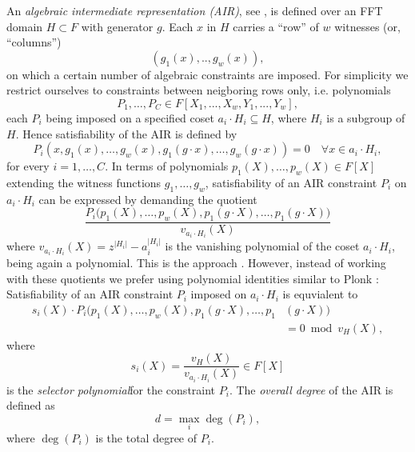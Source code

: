 \documentclass[11pt,article,oneside]{memoir}
\theoremstyle{definition}
\theoremstyle{remark}
\begin{document}
An \textit{algebraic intermediate representation (AIR)}, see \cite{Starks, DEEPFRI, ethSTARK}, is defined over an FFT domain $H\subset F$ with generator $g$. 
Each $x$ in $H$ carries a “row” of $w$ witnesses (or, “columns”)
\[
(g_1(x),.., g_w(x)),
\]
on which a certain number of algebraic constraints are imposed.
For simplicity we restrict ourselves to constraints between neigboring rows only, i.e. polynomials 
\[
P_1, \ldots ,P_{C}\in F[X_1,...,X_w,Y_1,...,Y_w],  
\] 
each $P_i$ being imposed on a specified coset $a_i\cdot H_i\subseteq H$, where $H_i$ is a subgroup of $H$.
Hence satisfiability of the AIR is defined by 
\begin{equation}
\label{e:AIRConstraint}
P_i(x, g_1(x),\ldots ,g_w(x),g_1(g\cdot x), \ldots,g_w(g\cdot x)) = 0 \quad \forall x \in a_i\cdot H_i,
\end{equation}
for every $i=1,\ldots,C$.
In terms of polynomials $p_1(X),\ldots, p_w(X)\in F[X]$ extending the witness functions $g_1, \ldots, g_w$, satisfiability of an AIR constraint $P_i$ on $a_i\cdot H_i$ can be expressed by demanding the quotient
\[
\frac{P_i\big(p_1(X), \ldots, p_w(X), p_1(g\cdot X), \ldots, p_1(g\cdot X)\big) }{ v_{a_i\cdot H_i}(X)}
\]
where $v_{a_i\cdot H_i}(X) = z^{|H_i|} - a_i^{|H_i|}$ is the vanishing polynomial of the coset $a_i\cdot H_i$, being again a polynomial.
This is the approach \cite{Starks, DEEPFRI, ethSTARK}.
However, instead of working with these quotients we prefer using polynomial identities similar to Plonk \cite{Plonk}:
Satisfiability of an AIR constraint $P_i$ imposed on $a_i\cdot H_i$ is equvialent to 
\begin{equation}
\label{e:AIRConstraintIdentity}
\begin{aligned}
s_i(X) \cdot P_i\big(p_1(X), \ldots, p_w(X), p_1(g\cdot X), \ldots, p_1&(g\cdot X)\big) 
\\
&= 0 \bmod v_H(X),
\end{aligned}
\end{equation}
where  
\begin{equation}
\label{e:SelectorPoly}
s_i(X) =\frac{v_H(X)}{v_{a_i\cdot H_i}(X)}  \in F[X]
\end{equation}
is the \textit{selector polynomial}\footnotemark for the constraint $P_i$.
%
The \textit{overall degree} of the AIR is defined as
\begin{equation}
d = \max_i \deg(P_i),
\end{equation}
where $\deg(P_i)$ is the total degree of $P_i$.
\end{document}
